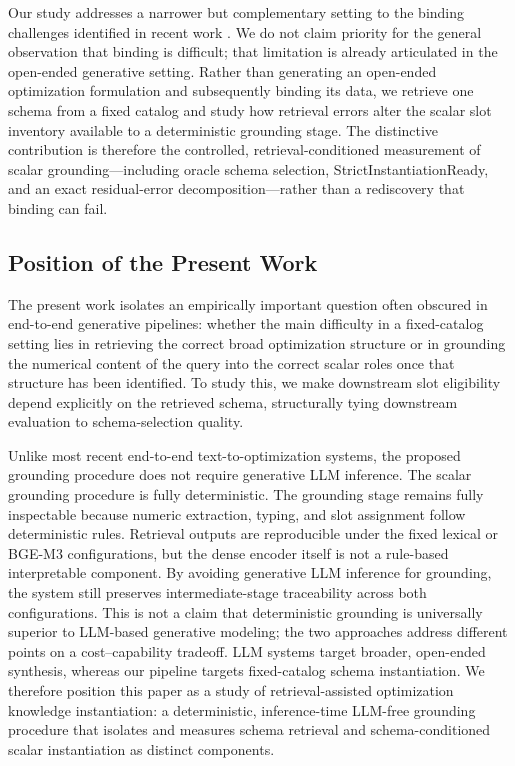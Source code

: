 \documentclass[pdflatex,sn-basic,Numbered]{sn-jnl}
\begin{document}
Our study addresses a narrower but complementary setting to the binding challenges identified in recent work \cite{gao2026models}. We do not claim priority for the general observation that binding is difficult; that limitation is already articulated in the open-ended generative setting. Rather than generating an open-ended optimization formulation and subsequently binding its data, we retrieve one schema from a fixed catalog and study how retrieval errors alter the scalar slot inventory available to a deterministic grounding stage. The distinctive contribution is therefore the controlled, retrieval-conditioned measurement of scalar grounding---including oracle schema selection, StrictInstantiationReady, and an exact residual-error decomposition---rather than a rediscovery that binding can fail. 

\subsection{Position of the Present Work}
\label{subsec:rw_position}

The present work isolates an empirically important question often obscured in end-to-end generative pipelines: whether the main difficulty in a fixed-catalog setting lies in retrieving the correct broad optimization structure or in grounding the numerical content of the query into the correct scalar roles once that structure has been identified. To study this, we make downstream slot eligibility depend explicitly on the retrieved schema, structurally tying downstream evaluation to schema-selection quality. 

Unlike most recent end-to-end text-to-optimization systems, the proposed grounding procedure does not require generative LLM inference. The scalar grounding procedure is fully deterministic. The grounding stage remains fully inspectable because numeric extraction, typing, and slot assignment follow deterministic rules. Retrieval outputs are reproducible under the fixed lexical or BGE-M3 configurations, but the dense encoder itself is not a rule-based interpretable component. By avoiding generative LLM inference for grounding, the system still preserves intermediate-stage traceability across both configurations. This is not a claim that deterministic grounding is universally superior to LLM-based generative modeling; the two approaches address different points on a cost--capability tradeoff. LLM systems target broader, open-ended synthesis, whereas our pipeline targets fixed-catalog schema instantiation. We therefore position this paper as a study of retrieval-assisted optimization knowledge instantiation: a deterministic, inference-time LLM-free grounding procedure that isolates and measures schema retrieval and schema-conditioned scalar instantiation as distinct components.
\end{document}
